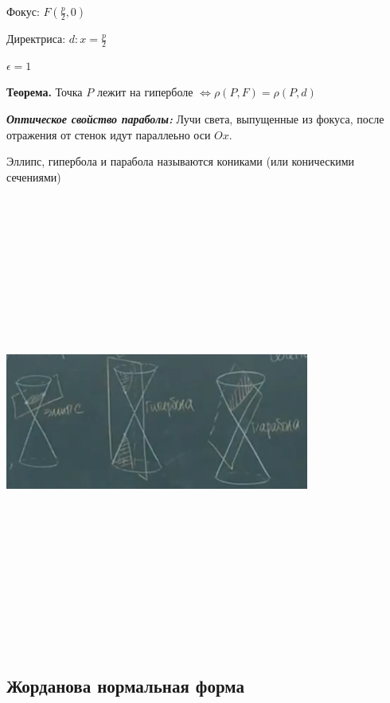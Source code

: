 \vspace{\baselineskip}
Фокус: $F(\frac{p}{2}, 0)$

Директриса: $d: x = \frac{p}{2}$

$\epsilon = 1$

\vspace{\baselineskip}
\textbf{Теорема.} Точка $P$ лежит на гиперболе $\Leftrightarrow \rho(P, F) = \rho(P, d)$

\vspace{\baselineskip}
\textbf{\textit{Оптическое свойство параболы:}} Лучи света, выпущенные из фокуса, после отражения от стенок идут параллеьно оси $Ox$.

\vspace{\baselineskip}
Эллипс, гипербола и парабола называются кониками (или коническими сечениями)

\vspace{\baselineskip}
\includegraphics[width=10cm,height=15cm,keepaspectratio]{example6.jpg}

\subsection{Жорданова нормальная форма}

